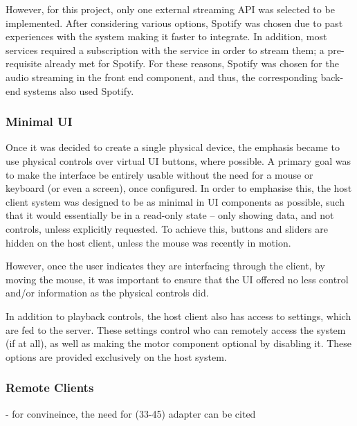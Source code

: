                 However, for this project, only one external streaming API was selected to be implemented. After considering various options, Spotify was chosen due to past experiences with the system making it faster to integrate. In addition, most services required a subscription with the service in order to stream them; a pre-requisite already met for Spotify. For these reasons, Spotify was chosen for the audio streaming in the front end component, and thus, the corresponding back-end systems also used Spotify.
    
            \subsubsection{Minimal UI}
    
                Once it was decided to create a single physical device, the emphasis became to use physical controls over virtual UI buttons, where possible. A primary goal was to make the interface be entirely usable without the need for a mouse or keyboard (or even a screen), once configured. In order to emphasise this, the host client system was designed to be as minimal in UI components as possible, such that it would essentially be in a read-only state -- only showing data, and not controls, unless explicitly requested. To achieve this, buttons and sliders are hidden on the host client, unless the mouse was recently in motion.
    
                However, once the user indicates they are interfacing through the client, by moving the mouse, it was important to ensure that the UI offered no less control and/or information as the physical controls did.
    
                In addition to playback controls, the host client also has access to settings, which are fed to the server. These settings control who can remotely access the system (if at all), as well as making the motor component optional by disabling it. These options are provided exclusively on the host system.
        
            \subsubsection{Remote Clients}
    
                \begin{temp}
                    - for convineince, the need for (33-45) adapter  can be cited
                \end{temp}
    
